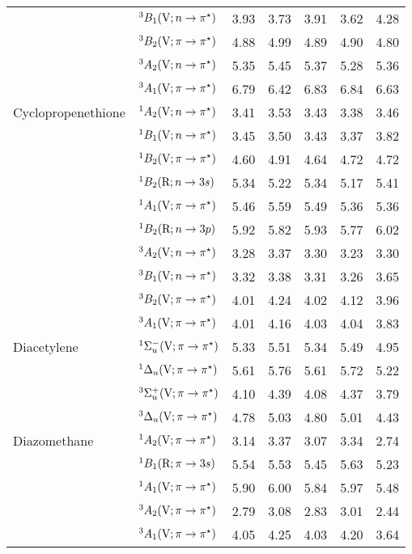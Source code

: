 \begin{tabular}{p{3.5cm}p{3.3cm}c|cccc}
        &$^3B_1 (\mathrm{V}; n \rightarrow \pi^\star)$					& 3.93	&3.73	&3.91	&3.62	&4.28\\ 	
        &$^3B_2 (\mathrm{V}; \pi \rightarrow \pi^\star)$				& 4.88	&4.99	&4.89	&4.90	&4.80\\ 	
        &$^3A_2 (\mathrm{V}; n \rightarrow \pi^\star)$					& 5.35	&5.45	&5.37	&5.28	&5.36\\ 	
        &$^3A_1 (\mathrm{V}; \pi \rightarrow \pi^\star)$				& 6.79	&6.42	&6.83	&6.84	&6.63\\ 	
  Cyclopropenethione&$^1A_2 (\mathrm{V}; n \rightarrow \pi^\star)$				& 3.41	&3.53	&3.43	&3.38	&3.46\\ 	
        &$^1B_1 (\mathrm{V}; n \rightarrow \pi^\star)$					& 3.45	&3.50	&3.43	&3.37	&3.82\\ 	
        &$^1B_2 (\mathrm{V}; \pi \rightarrow \pi^\star)$				& 4.60	&4.91	&4.64	&4.72	&4.72\\ 	
        &$^1B_2 (\mathrm{R}; n \rightarrow 3s)$					& 5.34	&5.22	&5.34	&5.17	&5.41\\ 	
        &$^1A_1 (\mathrm{V}; \pi \rightarrow \pi^\star)$				& 5.46	&5.59	&5.49	&5.36	&5.36\\ 	
        &$^1B_2 (\mathrm{R}; n \rightarrow 3p)$					& 5.92	&5.82	&5.93	&5.77	&6.02\\ 	
        &$^3A_2 (\mathrm{V}; n \rightarrow \pi^\star)$					& 3.28	&3.37	&3.30	&3.23	&3.30\\ 	
        &$^3B_1 (\mathrm{V}; n \rightarrow \pi^\star)$					& 3.32	&3.38	&3.31	&3.26	&3.65\\ 	
        &$^3B_2 (\mathrm{V}; \pi \rightarrow \pi^\star)$				& 4.01	&4.24	&4.02	&4.12	&3.96\\ 	
        &$^3A_1 (\mathrm{V}; \pi \rightarrow \pi^\star)$				& 4.01	&4.16	&4.03	&4.04	&3.83\\ 	
  Diacetylene	&$^1\Sigma_u^- (\mathrm{V}; \pi \rightarrow \pi^\star)$			& 5.33	&5.51	&5.34	&5.49	&4.95 \\	
        &$^1\Delta_u 	(\mathrm{V}; \pi \rightarrow \pi^\star)$			& 5.61	&5.76	&5.61	&5.72	&5.22 \\	
        &$^3\Sigma_u^+ (\mathrm{V}; \pi \rightarrow \pi^\star)$			& 4.10	&4.39	&4.08	&4.37	&3.79 \\	
        &$^3\Delta_u 	(\mathrm{V}; \pi \rightarrow \pi^\star)$			& 4.78	&5.03	&4.80	&5.01	&4.43 \\	
  Diazomethane	&$^1A_2 (\mathrm{V};\pi \rightarrow \pi^\star)$ 				&3.14	&3.37	&3.07	&3.34	&2.74	\\
        &$^1B_1 (\mathrm{R};\pi \rightarrow 3s)$ 				&5.54	&5.53	&5.45	&5.63	&5.23	\\
        &$^1A_1 (\mathrm{V};\pi \rightarrow \pi^\star)$				&5.90	&6.00	&5.84	&5.97	&5.48	\\
        &$^3A_2 (\mathrm{V};\pi \rightarrow \pi^\star)$ 				&2.79	&3.08	&2.83	&3.01	&2.44	\\
        &$^3A_1 (\mathrm{V};\pi \rightarrow \pi^\star)$				&4.05	&4.25	&4.03	&4.20	&3.64	\\

\end{tabular}

